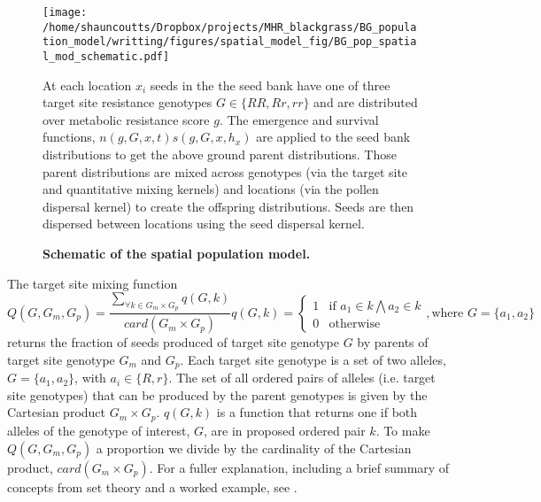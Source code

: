 \documentclass[10pt,letterpaper]{article}
\begin{document}
\begin{figure}[!h] 
	\texttt{[image: /home/shauncoutts/Dropbox/projects/MHR\_blackgrass/BG\_population\_model/writting/figures/spatial\_model\_fig/BG\_pop\_spatial\_mod\_schematic.pdf]}
\caption{\bf Schematic of the spatial population model.} At each location $x_i$ seeds in the the seed bank have one of three target site resistance genotypes $G \in \{RR, Rr, rr\}$ and are distributed over metabolic resistance score $g$. The emergence and survival functions, $n(g, G, x, t)s(g, G, x, h_x)$ are applied to the seed bank distributions to get the above ground parent distributions. Those parent distributions are mixed across genotypes (via the target site and quantitative mixing kernels) and locations (via the pollen dispersal kernel) to create the offspring distributions. Seeds are then dispersed between locations using the seed dispersal kernel.
\label{fig:schematic}
\end{figure}


The target site mixing function
\begin{subequations}
\begin{equation}\label{eq:TSR_mixing_kern}
	Q(G, G_m, G_p) = \frac{\sum_{\forall k \in G_m \times G_p} q(G, k)}{card\left( G_m \times G_p \right)}
\end{equation}      
\begin{equation}\label{eq:allel_count}
	q(G, k) = \begin{cases}
		1 &\text{if } a_1 \in k \bigwedge a_2 \in k\\
		0 &\text{otherwise} 
	\end{cases}, \text{where } G = \{a_1, a_2\}
\end{equation} 
\end{subequations}
returns the fraction of seeds produced of target site genotype $G$ by parents of target site genotype $G_m$ and $G_p$. Each target site genotype is a set of two alleles, $G = \{a_1, a_2\}$, with $a_i \in \{R, r \}$. The set of all ordered pairs of alleles (i.e. target site genotypes) that can be produced by the parent genotypes is given by the Cartesian product $G_m \times G_p$. $q(G, k)$ is a function that returns one if both alleles of the genotype of interest, $G$, are in proposed ordered pair $k$. To make $Q(G, G_m, G_p)$ a proportion we divide by the cardinality of the Cartesian product, $card \left( G_m \times G_p \right)$. For a fuller explanation, including a brief summary of concepts from set theory and a worked example, see .
\end{document}
